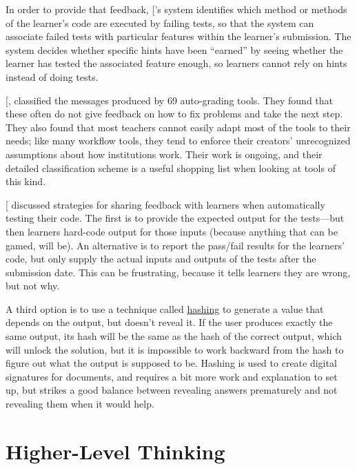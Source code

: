 In order to provide that feedback, {[}\protect[\hyperlink{b:Buff2015}{Buff2015}]{]}'s system
identifies which method or methods of the learner's code are executed by
failing tests, so that the system can associate failed tests with
particular features within the learner's submission. The system decides
whether specific hints have been ``earned'' by seeing whether the learner
has tested the associated feature enough, so learners cannot rely on
hints instead of doing tests.

{[},\protect[\hyperlink{b:Keun2016b}{Keun2016b}]{]} classified the messages produced by 69
auto-grading tools. They found that these often do not give feedback on
how to fix problems and take the next step. They also found that most
teachers cannot easily adapt most of the tools to their needs; like many
workflow tools, they tend to enforce their creators' unrecognized
assumptions about how institutions work. Their work is ongoing, and
their detailed classification scheme is a useful shopping list when
looking at tools of this kind.

{[}\protect[\hyperlink{b:Srid2016}{Srid2016}]{]} discussed strategies for sharing feedback with
learners when automatically testing their code. The first is to provide
the expected output for the tests---but then learners hard-code output for
those inputs (because anything that can be gamed, will be). An
alternative is to report the pass/fail results for the learners' code,
but only supply the actual inputs and outputs of the tests after the
submission date. This can be frustrating, because it tells learners they
are wrong, but not why.

A third option is to use a technique called \protect\hyperlink{g:hashing}{hashing} to
generate a value that depends on the output, but doesn't reveal it. If
the user produces exactly the same output, its hash will be the same
as the hash of the correct output, which will unlock the solution, but
it is impossible to work backward from the hash to figure out what the
output is supposed to be. Hashing is used to create digital signatures
for documents, and requires a bit more work and explanation to set up,
but strikes a good balance between revealing answers prematurely and
not revealing them when it would help.

\section{Higher-Level Thinking}\label{s:exercises-higher}

